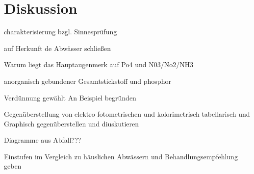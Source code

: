 \chapter{Diskussion}
\label{sec:diskussion}
charakterisierung bzgl. Sinnesprüfung

auf Herkunft de Abwässer schließen

Warum liegt das Hauptaugenmerk auf Po4 und N03/No2/NH3

anorganisch gebundener Gesamtstickstoff und phosphor

Verdünnung gewählt
An Beispiel begründen

Gegenüberstellung von elektro fotometrischen und kolorimetrisch
tabellarisch und Graphisch gegenüberstellen und diuskutieren

Diagramme aus Abfall???

Einstufen im Vergleich zu häuslichen Abwässern und Behandlungsempfehlung geben

